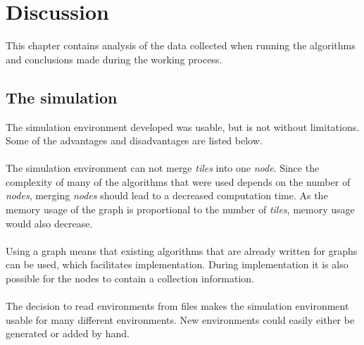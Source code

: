 \chapter{Discussion}
This chapter contains analysis of the data collected when running the algorithms and conclusions made during the working process.

\section{The simulation}
The simulation environment developed was usable, but is not without limitations. Some of the advantages and disadvantages are listed below.\\\\
The simulation environment can not merge \emph{tiles} into one \emph{node}. Since the complexity of many of the algorithms that were used depends on the number of \emph{nodes}, merging \emph{nodes} should lead to a decreased computation time. As the memory usage of the graph is proportional to the number of \emph{tiles}, memory usage would also decrease.\\\\
Using a graph means that existing algorithms that are already written for graphs %
can be used, which facilitates implementation. During implementation it is also possible for the nodes to contain a collection information.\\
\\The decision to read environments from files makes the simulation environment usable for many different environments. New environments could easily either be generated or added by hand.
